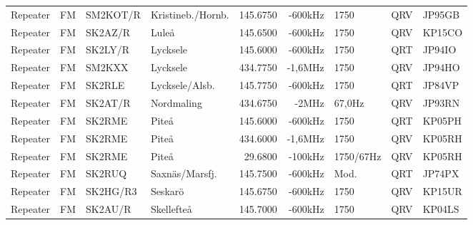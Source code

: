 \begin{landscape}
\begin{longtable}{llllrrlcl}
	Repeater                  & FM            & SM2KOT/R      & Kristineb./Hornb.   & 145.6750          & -600kHz        & 1750             & QRV             & JP95GB           \\
	Repeater                  & FM            & SK2AZ/R       & Luleå               & 145.6500          & -600kHz        & 1750             & QRV             & KP15CO           \\
	Repeater                  & FM            & SK2LY/R       & Lycksele            & 145.6000          & -600kHz        & 1750             & QRT             & JP94IO           \\
	Repeater                  & FM            & SM2KXX        & Lycksele            & 434.7750          & -1,6MHz        & 1750             & QRV             & JP94HO           \\
	Repeater                  & FM            & SK2RLE        & Lycksele/Alsb.      & 145.7750          & -600kHz        & 1750             & QRT             & JP84VP           \\
	Repeater                  & FM            & SK2AT/R       & Nordmaling          & 434.6750          & -2MHz          & 67,0Hz           & QRV             & JP93RN           \\
	Repeater                  & FM            & SK2RME        & Piteå               & 145.6000          & -600kHz        & 1750             & QRT             & KP05PH           \\
	Repeater                  & FM            & SK2RME        & Piteå               & 434.6000          & -1,6MHz        & 1750             & QRV             & KP05RH           \\
	Repeater                  & FM            & SK2RME        & Piteå               & 29.6800           & -100kHz        & 1750/67Hz        & QRV             & KP05RH           \\
	Repeater                  & FM            & SK2RUQ        & Saxnäs/Marsfj.      & 145.7500          & -600kHz        & Mod.             & QRT             & JP74PX           \\
	Repeater                  & FM            & SK2HG/R3      & Seskarö             & 145.6750          & -600kHz        & 1750             & QRV             & KP15UR           \\
	Repeater                  & FM            & SK2AU/R       & Skellefteå          & 145.7000          & -600kHz        & 1750             & QRV             & KP04LS           \\

\end{longtable}
\end{landscape}
